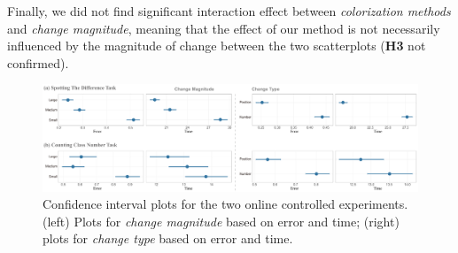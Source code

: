 

Finally, we did not find significant interaction effect between \emph{colorization methods} and \emph{change magnitude}, meaning that the effect of our method is not necessarily influenced by the magnitude of change between the two scatterplots (\textbf{H3} not confirmed).

\begin{figure}[h]
\centering
\includegraphics[width=1\linewidth]{figures/user-result-formal-variables.pdf}
\caption{Confidence interval plots for the two online controlled experiments. (left) Plots for \emph{change magnitude} based on error and time; (right) plots for \emph{change type} based on error and time.}
\vspace*{-3mm}
\label{fig:userResultsVar}
\end{figure}

